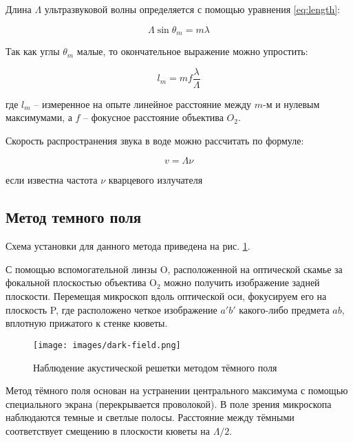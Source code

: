 \documentclass[a4paper,12pt]{article}
\begin{document}
Длина $\Lambda$ ультразвуковой волны определяется с помощью уравнения \eqref{eq:length}:

\begin{equation}\label{eq:length}
    \Lambda \sin{\theta_m} = m \lambda
\end{equation}

Так как углы $\theta_m$ малые, то окончательное выражение можно упростить:

\begin{equation}\label{eq:final}
    l_m = m f \frac{\lambda}{\Lambda}
\end{equation}

где $l_m$ -- измеренное на опыте линейное расстояние между $m$-м и нулевым максимумами, а $f$ -- фокусное расстояние объектива $O_2$.

Скорость распространения звука в воде можно рассчитать по формуле:

\begin{equation}\label{eq:sound-speed}
    v = \Lambda \nu
\end{equation}

если известна частота $\nu$ кварцевого излучателя

\subsection*{Метод темного поля}

Схема установки для данного метода приведена на рис. \ref{pic:dark-field}.

С помощью вспомогательной линзы O, расположенной на оптической скамье за фокальной плоскостью объектива $\text{O}_2$ можно получить изображение задней плоскости. Перемещая микроскоп вдоль оптической оси, фокусируем его на плоскость P, где расположено четкое изображение $a'b'$ какого-либо предмета $ab$, вплотную прижатого к стенке кюветы.

\FloatBarrier
\begin{figure}[!h]
	\centering
	\texttt{[image: images/dark-field.png]}
	\caption{Наблюдение акустической решетки методом тёмного поля}
	\label{pic:dark-field}
\end{figure}
\FloatBarrier

Метод тёмного поля основан на устранении центрального максимума с помощью специального экрана (перекрывается проволокой). В поле зрения микроскопа наблюдаются темные и светлые полосы. Расстояние между тёмными соответствует смещению в плоскости кюветы на $\Lambda/2$.
\end{document}
